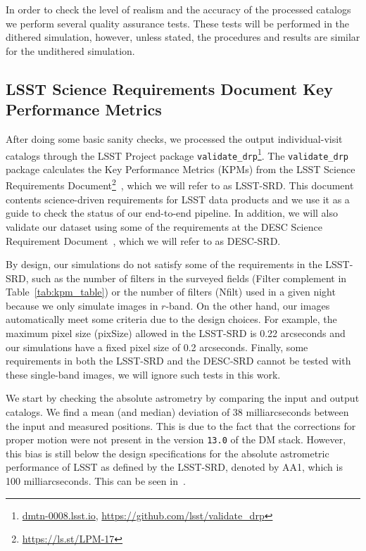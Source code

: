 \documentclass[twocolumn]{aastex62}
\begin{document}
In order to check the level of realism and the accuracy of the processed catalogs we perform several quality assurance tests. These tests will be performed in the dithered simulation, however, unless stated, the procedures and results are similar for the undithered simulation.

\subsection{LSST Science Requirements Document Key Performance Metrics}

After doing some basic sanity checks, we processed the output individual-visit catalogs through the LSST Project package \texttt{validate\_drp}\footnote{\url{dmtn-0008.lsst.io}, \url{https://github.com/lsst/validate_drp}}.
The \texttt{validate\_drp} package calculates the Key Performance Metrics (KPMs) from the LSST Science Requirements Document\footnote{\url{https://ls.st/LPM-17}}~\citep{LPM-17}, which we will refer to as LSST-SRD. This document contents science-driven requirements for LSST data products and we use it as a guide to check the status of our end-to-end pipeline. In addition, we will also validate our dataset using some of the requirements at the DESC Science Requirement Document~\citep[][DESC-SRD;]{2018arXiv180901669T}, which we will refer to as DESC-SRD.
 
By design, our simulations do not satisfy some of the requirements in the LSST-SRD, such as the number of filters in the surveyed fields (Filter complement in Table~\ref{tab:kpm_table}) or the number of filters (Nfilt) used in a given night because we only simulate images in $r$-band. On the other hand, our images automatically meet some criteria due to the design choices. For example, the maximum pixel size (pixSize) allowed in the LSST-SRD is 0.22 arcseconds and our simulations have a fixed pixel size of 0.2 arcseconds. Finally, some requirements in both the LSST-SRD and the DESC-SRD cannot be tested with these single-band images, we will ignore such tests in this work.

We start by checking the absolute astrometry by comparing the input and output catalogs. We find a mean (and median) deviation of 38 milliarcseconds between the input and measured positions. This is due to the fact that the corrections for proper motion were not present in the version \texttt{13.0} of the DM stack. However, this bias is still below the design specifications for the absolute astrometric performance of LSST as defined by the LSST-SRD, denoted by AA1, which is 100 milliarcseconds. This can be seen in~.
\end{document}
